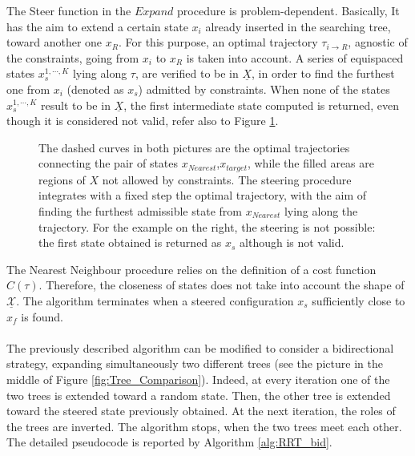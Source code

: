 The Steer function in the $Expand$ procedure is problem-dependent. Basically, It has the aim to extend a certain state $x_i$ already inserted in the searching tree, toward another one $x_R$. For this purpose, an optimal trajectory $\tau_{ i \rightarrow R}$, agnostic of the constraints, going from $x_i$ to $x_R$ is taken into account. A series of equispaced states $x^{1,\cdots,K}_s$ lying along $\tau$, are verified to be in $\underline{X}$, in order to find the furthest one from $x_i$ (denoted as $x_s$) admitted by constraints. When none of the states $x^{1,\cdots,K}_s$ result to be in $\underline{X}$, the first intermediate state computed is returned, even though it is considered not valid, refer also to Figure \ref{fig:Steer}.
\begin{figure}
	\centering
{} \quad
{}
\caption{The dashed curves in both pictures are the optimal trajectories connecting the pair of states $x_{Nearest}$,$x_{target}$, while the filled areas are regions of $X$ not allowed by constraints.	
	The steering procedure integrates with a fixed step the optimal trajectory, with the aim of finding the furthest admissible state from $x_{Nearest}$ lying along the trajectory. For the example on the right, the steering is not possible: the first state obtained is returned as $x_s$ although is not valid.}
	\label{fig:Steer}
\end{figure}


The Nearest Neighbour procedure relies on the definition of a cost function $C(\tau)$. Therefore, the closeness of states does not take into account the shape of $\underline{\mathcal{X}}$.
The algorithm terminates when a steered configuration $x_s$ sufficiently close to $x_f$ is found.     
\\
\\
The previously described algorithm can be modified to consider a bidirectional strategy, expanding simultaneously two different trees \cite{RRT_bid} (see the picture in the middle of Figure \ref{fig:Tree_Comparison}). Indeed, at every iteration one of the two trees is extended toward a random state. Then, the other tree is extended toward the steered state previously obtained. At the next iteration, the roles of the trees are inverted. The algorithm stops, when the two trees meet each other. The detailed pseudocode is reported by Algorithm \ref{alg:RRT_bid}.

